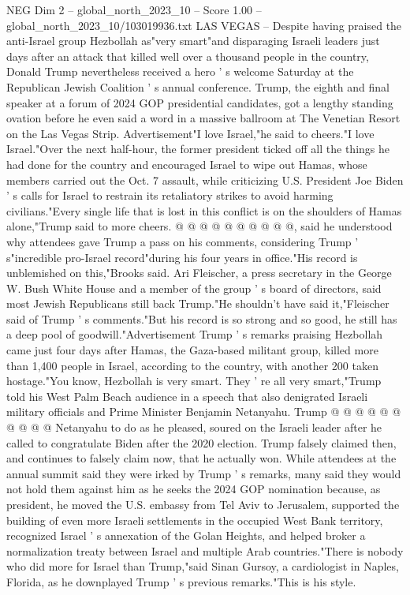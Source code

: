 \begin{textsample}{NEG Dim 2 – global\_north\_2023\_10 – Score 1.00 – global\_north\_2023\_10/103019936.txt}  \label{ex:f2_neg_163}
LAS VEGAS -- Despite having praised the anti-Israel group Hezbollah as"very smart"and disparaging Israeli leaders just days after an attack that killed well over a thousand people in the country, Donald Trump nevertheless received a hero ' s welcome Saturday at the Republican Jewish Coalition ' s annual conference.
Trump, the eighth and final speaker at a forum of 2024 GOP presidential candidates, got a lengthy standing ovation before he even said a word in a massive ballroom at The Venetian Resort on the Las Vegas Strip.
Advertisement"I love Israel,"he said to cheers."I love Israel."Over the next half-hour, the former president ticked off all the things he had done for the country and encouraged Israel to wipe out Hamas, whose members carried out the Oct. 7 assault, while criticizing U.S.
President Joe Biden ' s calls for Israel to restrain its retaliatory strikes to avoid harming civilians."Every single life that is lost in this conflict is on the shoulders of Hamas alone,"Trump said to more cheers. @ @ @ @ @ @ @ @ @ @, said he understood why attendees gave Trump a pass on his comments, considering Trump ' s"incredible pro-Israel record"during his four years in office."His record is unblemished on this,"Brooks said.
Ari Fleischer, a press secretary in the George W.
Bush White House and a member of the group ' s board of directors, said most Jewish Republicans still back Trump."He shouldn't have said it,"Fleischer said of Trump ' s comments."But his record is so strong and so good, he still has a deep pool of goodwill."Advertisement Trump ' s remarks praising Hezbollah came just four days after Hamas, the Gaza-based militant group, killed more than 1,400 people in Israel, according to the country, with another 200 taken hostage."You know, Hezbollah is very smart.
They ' re all very smart,"Trump told his West Palm Beach audience in a speech that also denigrated Israeli military officials and Prime Minister Benjamin Netanyahu.
Trump @ @ @ @ @ @ @ @ @ @ Netanyahu to do as he pleased, soured on the Israeli leader after he called to congratulate Biden after the 2020 election.
Trump falsely claimed then, and continues to falsely claim now, that he actually won.
While attendees at the annual summit said they were irked by Trump ' s remarks, many said they would not hold them against him as he seeks the 2024 GOP nomination because, as president, he moved the U.S. embassy from Tel Aviv to Jerusalem, supported the building of even more Israeli settlements in the occupied West Bank territory, recognized Israel ' s annexation of the Golan Heights, and helped broker a normalization treaty between Israel and multiple Arab countries."There is nobody who did more for Israel than Trump,"said Sinan Gursoy, a cardiologist in Naples, Florida, as he downplayed Trump ' s previous remarks."This is his style.

\end{textsample}
